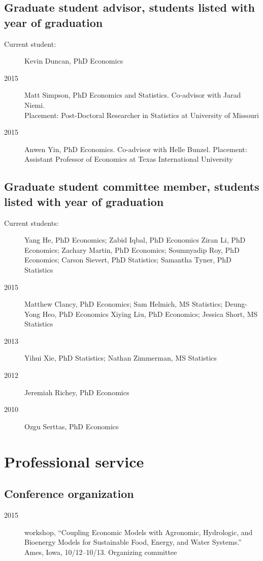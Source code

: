 \documentclass[12pt]{article}%
\newcommand{\allcaps}[1]{\textls{\MakeUppercase{#1}}}
\begin{document}
\subsection*{Graduate student advisor, students listed with year of graduation}
\begin{description}
\item[Current student:] Kevin Duncan, PhD Economics
\item[2015] Matt Simpson, PhD Economics and Statistics.  Co-advisor
with Jarad Niemi.\\
Placement: Post-Doctoral Researcher in Statistics at University of Missouri
\item[2015] Anwen Yin, PhD Economics. Co-advisor with Helle Bunzel.
Placement: Assistant Professor of Economics at Texas 
International University
\end{description}

\subsection*{Graduate student committee member, students listed with year of graduation}

\begin{description}
\item[Current students:]
Yang He, PhD Economics;
Zabid Iqbal, PhD Economics
Ziran Li, PhD Economics;
Zachary Martin, PhD Economics;
Soumnyadip Roy, PhD Economics;
Carson Sievert, PhD Statistics;
Samantha Tyner, PhD Statistics
\item[2015]
Matthew Clancy, PhD Economics;
Sam Helmich, MS Statistics;
Deung-Yong Heo, PhD Economics
Xiying Liu, PhD Economics;
Jessica Short, MS Statistics
\item[2013]
Yihui Xie, PhD Statistics;
Nathan Zimmerman, MS Statistics
\item[2012] Jeremiah Richey, PhD Economics
\item[2010] Ozgu Serttas, PhD Economics
\end{description}

\section*{Professional service}

\subsection*{Conference organization}
\begin{description}
\item[2015] \allcaps{NSF} workshop, ``Coupling Economic Models with
Agronomic, Hydrologic, and Bioenergy Models for Sustainable Food,
Energy, and Water Systems.''  Ames, Iowa, 10/12--10/13. Organizing
committee
\end{description}
\end{document}
